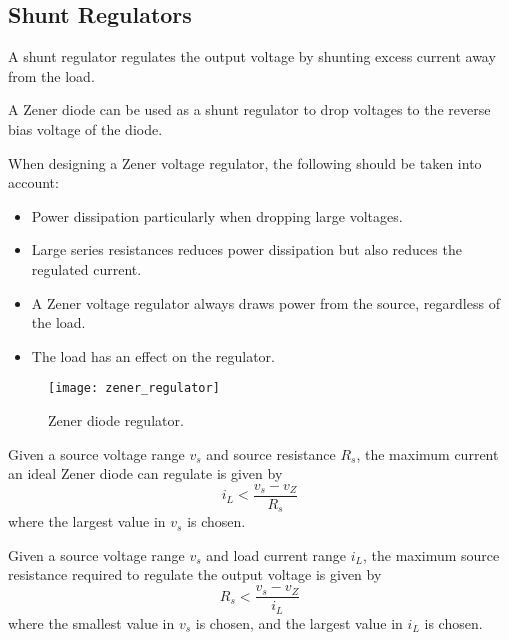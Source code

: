\documentclass{article}
\begin{document}
\subsection{Shunt Regulators}
\begin{definition}
    A shunt regulator regulates the output voltage by shunting excess current away from the load.
\end{definition}
A Zener diode can be used as a shunt regulator to drop voltages to the reverse bias voltage of the diode.
\begin{remark}
    When designing a Zener voltage regulator, the following should be taken into account:
    \begin{itemize}
        \item Power dissipation particularly when dropping large voltages.
        \item Large series resistances reduces power dissipation but also reduces the regulated current. 
        \item A Zener voltage regulator always draws power from the source, regardless of the load.
        \item The load has an effect on the regulator.
    \end{itemize}
\end{remark}
\begin{figure}[H]
    \centering
    \texttt{[image: zener\_regulator]}
    \caption{Zener diode regulator.}
\end{figure}
\begin{theorem}
    Given a source voltage range $v_s$ and source resistance $R_s$, the maximum current an ideal
    Zener diode can regulate is given by
    \begin{equation*}
        i_L < \frac{v_s - v_Z}{R_s}
    \end{equation*}
    where the largest value in $v_s$ is chosen.
\end{theorem}
\begin{theorem}
    Given a source voltage range $v_s$ and load current range $i_L$, the maximum source resistance required
    to regulate the output voltage is given by
    \begin{equation*}
        R_s < \frac{v_s - v_Z}{i_L}
    \end{equation*}
    where the smallest value in $v_s$ is chosen, and the largest value in $i_L$ is chosen.
\end{theorem}
\end{document}
